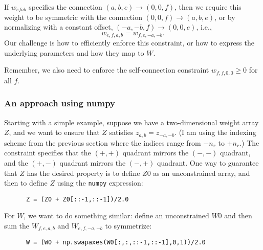 \documentclass[11pt,letterpaper]{article}
\theoremstyle{definition}
\begin{document}
If $w_{efab}$ specifies the connection $(a,b,e) \to (0,0,f)$, then we require 
this weight to be symmetric with the connection $(0,0,f)\to(a,b,e)$,
or by normalizing with a constant offset, $(-a,-b,f)\to (0,0,e)$, i.e., 
\[
w_{e,f,a,b} = w_{f,e,-a,-b}.
\]
Our challenge is how to efficiently enforce this constraint, or how
to express the underlying parameters and how they map to $W$. 

Remember, we also need to enforce the self-connection constraint $w_{f,f,0,0}\ge0$ for all $f$.

\subsubsection{An approach using numpy}

Starting with a simple example, suppose we have a two-dimensional weight
array $Z$, and we want to ensure that $Z$ satisfies $z_{a,b}=z_{-a,-b}$.
(I am using the indexing scheme from the previous section where the indices
range from $-n_r$ to $+n_r$.) The constraint specifies that the $(+,+)$ quadrant
mirrors the $(-,-)$ quadrant, and the $(+,-)$ quadrant mirrors the
$(-,+)$ quadrant.  One way to guarantee that $Z$ has the desired property is
to define $Z0$ as an unconstrained array, and then to define $Z$ using
the {\tt numpy} expression:
\begin{verbatim}
      Z = (Z0 + Z0[::-1,::-1])/2.0
\end{verbatim}

For $W$, we want to do something similar: define an unconstrained $W0$ and
then sum the $W_{f,e,a,b}$ and $W_{e,f,-a,-b}$ to symmetrize:
\begin{verbatim}
      W = (W0 + np.swapaxes(W0[:,:,::-1,::-1],0,1))/2.0
\end{verbatim}
\end{document}
